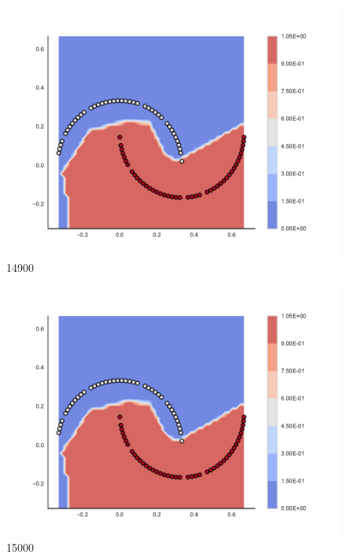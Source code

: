 \begin{subfigure}[b]{0.09\textwidth}
    \includegraphics[clip, trim=2.35cm 1.75cm 4.5cm 0cm,width=\textwidth]{img/convergence/14900.pdf}
    \caption{14900}
    \label{fig:convergence_14900}
\end{subfigure}
%
\begin{subfigure}[b]{0.09\textwidth}
    \includegraphics[clip, trim=2.35cm 1.75cm 4.5cm 0cm,width=\textwidth]{img/convergence/15000.pdf}
    \caption{15000}
    \label{fig:convergence_15000}
\end{subfigure}
%
